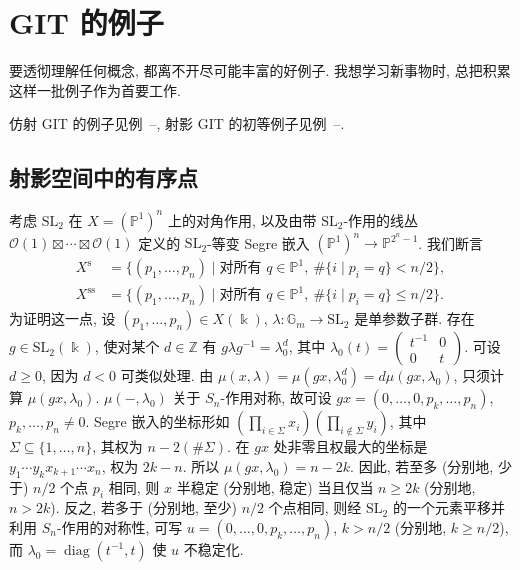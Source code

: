 \section{GIT 的例子}\label{src:8.5}
\begin{epigraph}
要透彻理解任何概念, 都离不开尽可能丰富的好例子. 我想学习新事物时, 总把积累这样一批例子作为首要工作.
\end{epigraph}
仿射 GIT 的例子见例~--, 射影 GIT 的初等例子见例~--.
\subsection{射影空间中的有序点}\label{src:8.5.1-subsection}
\begin{example}\label{src:8.5.1}
考虑 $\mathrm{SL}_2$ 在 $X=(\mathbb P^1)^n$ 上的对角作用, 以及由带 $\mathrm{SL}_2$-作用的线丛 $\mathcal O(1)\boxtimes\cdots\boxtimes\mathcal O(1)$ 定义的 $\mathrm{SL}_2$-等变 Segre 嵌入 $(\mathbb P^1)^n\to\mathbb P^{2^n-1}$. 我们断言
\begin{align*}
X^{\mathrm s}&=\{(p_1,\ldots,p_n)\mid\text{对所有 }q\in\mathbb P^1,\ \#\{i\mid p_i=q\}<n/2\},\\
X^{\mathrm{ss}}&=\{(p_1,\ldots,p_n)\mid\text{对所有 }q\in\mathbb P^1,\ \#\{i\mid p_i=q\}\leq n/2\}.
\end{align*}
为证明这一点, 设 $(p_1,\ldots,p_n)\in X(\Bbbk)$, $\lambda:\mathbb G_m\to\mathrm{SL}_2$ 是单参数子群. 存在 $g\in\mathrm{SL}_2(\Bbbk)$, 使对某个 $d\in\mathbb Z$ 有 $g\lambda g^{-1}=\lambda_0^d$, 其中 $\lambda_0(t)=\begin{pmatrix}t^{-1}&0\\0&t\end{pmatrix}$. 可设 $d\geq0$, 因为 $d<0$ 可类似处理. 由 $\mu(x,\lambda)=\mu(gx,\lambda_0^d)=d\mu(gx,\lambda_0)$, 只须计算 $\mu(gx,\lambda_0)$. $\mu(-,\lambda_0)$ 关于 $S_n$-作用对称, 故可设 $gx=(0,\ldots,0,p_k,\ldots,p_n)$, $p_k,\ldots,p_n\ne0$. Segre 嵌入的坐标形如 $(\prod_{i\in\Sigma}x_i)(\prod_{i\notin\Sigma}y_i)$, 其中 $\Sigma\subseteq\{1,\ldots,n\}$, 其权为 $n-2(\#\Sigma)$. 在 $gx$ 处非零且权最大的坐标是 $y_1\cdots y_kx_{k+1}\cdots x_n$, 权为 $2k-n$. 所以 $\mu(gx,\lambda_0)=n-2k$. 因此, 若至多 (分别地, 少于) $n/2$ 个点 $p_i$ 相同, 则 $x$ 半稳定 (分别地, 稳定) 当且仅当 $n\geq2k$ (分别地, $n>2k$). 反之, 若多于 (分别地, 至少) $n/2$ 个点相同, 则经 $\mathrm{SL}_2$ 的一个元素平移并利用 $S_n$-作用的对称性, 可写 $u=(0,\ldots,0,p_k,\ldots,p_n)$, $k>n/2$ (分别地, $k\geq n/2$), 而 $\lambda_0=\operatorname{diag}(t^{-1},t)$ 使 $u$ 不稳定化.


\end{example}
